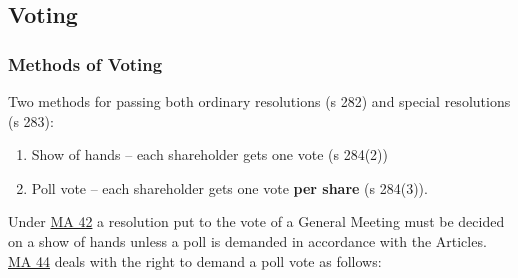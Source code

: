 \documentclass[
]{article}
\providecommand{\tightlist}{%
  \setlength{\itemsep}{0pt}\setlength{\parskip}{0pt}}
\begin{document}
\hypertarget{voting-1}{%
\subsection{Voting}\label{voting-1}}

\hypertarget{methods-of-voting}{%
\subsubsection{Methods of Voting}\label{methods-of-voting}}

Two methods for passing both ordinary resolutions (s 282) and special
resolutions (s 283):

\begin{enumerate}
\tightlist
\item
  Show of hands -- each shareholder gets one vote (s 284(2))
\item
  Poll vote -- each shareholder gets one vote \textbf{per share} (s
  284(3)).
\end{enumerate}

Under
\href{https://www.gov.uk/government/publications/model-articles-for-private-companies-limited-by-shares/model-articles-for-private-companies-limited-by-shares\#votinggen}{MA
42} a resolution put to the vote of a General Meeting must be decided on
a show of hands unless a poll is demanded in accordance with the
Articles.
\href{https://www.gov.uk/government/publications/model-articles-for-private-companies-limited-by-shares/model-articles-for-private-companies-limited-by-shares\#pollvotes}{MA
44} deals with the right to demand a poll vote as follows:
\end{document}
